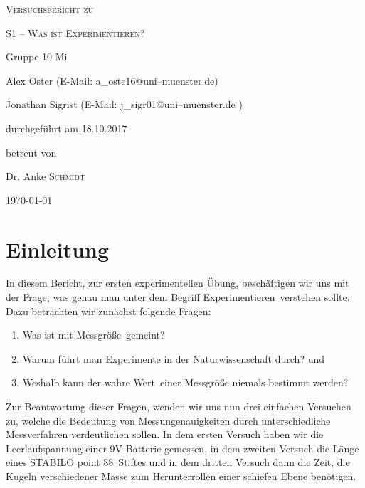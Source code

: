\documentclass[11pt,a4paper,titlepage, ngerman]{article}
\begin{document}
	\setlength{\parindent}{0em} 
	
	\begin{titlepage}
		\centering
		{\scshape\LARGE Versuchsbericht zu \par}
		\vspace{1cm}
		{\scshape\huge S1 -- Was ist Experimentieren?\par}
		\vspace{2.5cm}
		{\LARGE Gruppe 10 Mi\par}
		\vspace{0.5cm}
		{\large Alex Oster (E-Mail: a\_oste16@uni--muenster.de) \par}
		{\large Jonathan Sigrist (E-Mail: j\_sigr01@uni--muenster.de ) \par}
		\vfill
		durchgeführt am 18.10.2017\par
		betreut von\par
		{\large Dr. Anke \textsc{Schmidt}}
		
		\vfill
		
		{\large \today\par}
	\end{titlepage}
		
	\tableofcontents
	
	\newpage
	
	\section{Einleitung}
		\label{Einleitung}
		
		In diesem Bericht, zur ersten experimentellen Übung, beschäftigen wir uns mit der Frage, was genau man unter dem Begriff \glqq Experimentieren\grqq\ verstehen sollte. Dazu betrachten wir zunächst folgende Fragen:
	
		\begin{enumerate}
			
			\item Was ist mit \glqq Messgröße\grqq\ gemeint?
			\item Warum führt man Experimente in der Naturwissenschaft durch? und
			\item Weshalb kann der \glqq wahre Wert\grqq\ einer Messgröße niemals bestimmt werden?
			
		\end{enumerate}
			
			Zur Beantwortung dieser Fragen, wenden wir uns nun drei einfachen Versuchen zu, welche die Bedeutung von Messungenauigkeiten durch unterschiedliche Messverfahren verdeutlichen sollen. In dem ersten Versuch haben wir die Leerlaufspannung einer 9V-Batterie gemessen, in dem zweiten Versuch die Länge eines \glqq STABILO point 88\grqq\ Stiftes und in dem dritten Versuch dann die Zeit, die Kugeln verschiedener Masse zum Herunterrollen einer schiefen Ebene benötigen. \\
		
\end{document}
